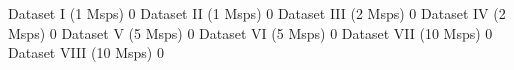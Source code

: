 Dataset I (1 Msps)
0
Dataset II (1 Msps)
0
Dataset III (2 Msps)
0
Dataset IV (2 Msps)
0
Dataset V (5 Msps)
0
Dataset VI (5 Msps)
0
Dataset VII (10 Msps)
0
Dataset VIII (10 Msps)
0
